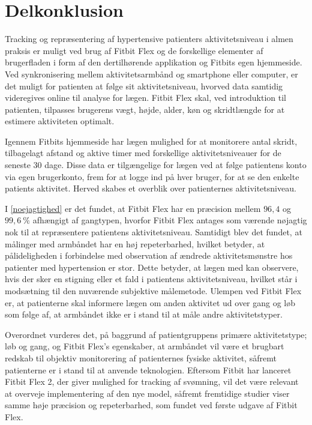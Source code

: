 \section{Delkonklusion}

Tracking og repræsentering af hypertensive patienters aktivitetsniveau i almen praksis er muligt ved brug af Fitbit Flex og de forskellige elementer af brugerfladen i form af den dertilhørende applikation og Fitbits egen hjemmeside. Ved synkronisering mellem aktivitetsarmbånd og smartphone eller computer, er  det muligt for patienten at følge sit aktivitetsniveau, hvorved data samtidig videregives online til analyse for lægen. Fitbit Flex skal, ved introduktion til patienten, tilpasses brugerens vægt, højde, alder, køn og skridtlængde for at estimere aktiviteten optimalt.

Igennem Fitbits hjemmeside har lægen mulighed for at monitorere antal skridt, tilbagelagt afstand og aktive timer med forskellige aktivitetsniveauer for de seneste $30$ dage. Disse data er tilgængelige for lægen ved at følge patientens konto via egen brugerkonto, frem for at logge ind på hver bruger, for at se den enkelte patients aktivitet. Herved skabes et overblik over patienternes aktivitetsniveau. 

I \autoref{noejagtighed} er det fundet, at Fitbit Flex har en præcision mellem $96,4$ og $99,6~\%$ afhængigt af gangtypen, hvorfor Fitbit Flex antages som værende nøjagtig nok til at repræsentere  patientens aktivitetsniveau. Samtidigt blev det fundet, at målinger med armbåndet har en høj repeterbarhed, hvilket betyder, at pålideligheden i forbindelse med observation af ændrede aktivitetsmønstre hos patienter med hypertension er stor. Dette  betyder, at lægen med kan observere, hvis der sker en stigning eller et fald i patientens aktivitetsniveau, hvilket står i modsætning til den nuværende subjektive målemetode. 
Ulempen ved Fitbit Flex er, at patienterne skal informere lægen om anden aktivitet ud over gang og løb som følge af, at armbåndet ikke er i stand til at måle andre aktivitetstyper.

Overordnet vurderes det, på baggrund af patientgruppens primære aktivitetstype; løb og gang, og Fitbit Flex's egenskaber, at armbåndet vil være et brugbart redskab til objektiv monitorering af patienternes fysiske aktivitet, såfremt patienterne er i stand til at anvende teknologien.  Eftersom Fitbit har lanceret Fitbit Flex 2, der giver mulighed for tracking af svømning, vil det være relevant at overveje implementering af den nye model, såfremt fremtidige studier viser samme høje præcision og repeterbarhed, som fundet ved første udgave af Fitbit Flex.